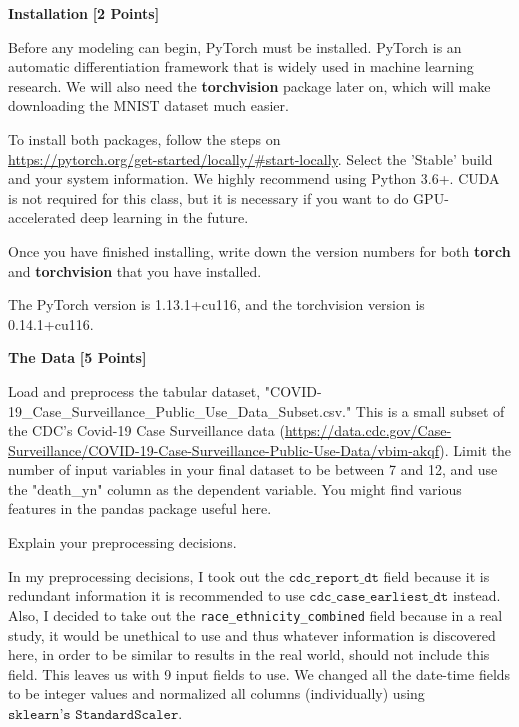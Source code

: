 \medskip

\problem \textbf{Installation} \textbf{[2 Points]}

Before any modeling can begin, PyTorch must be installed. PyTorch is an automatic differentiation framework that is widely used in machine learning research.  We will also need the \textbf{torchvision} package later on, which will make downloading the MNIST dataset much easier. 

To install both packages, follow the steps on \\
\url{https://pytorch.org/get-started/locally/#start-locally}. Select the 'Stable' build and your system information. We highly recommend using Python 3.6+. CUDA is not required for this class, but it is necessary if you want to do GPU-accelerated deep learning in the future.

Once you have finished installing, write down the version numbers for both \textbf{torch} and \textbf{torchvision} that you have installed.

\begin{solution}
  The PyTorch version is 1.13.1+cu116, and the torchvision version is 0.14.1+cu116.
\end{solution}

\problem \textbf{The Data} \textbf{[5 Points]}

Load and preprocess the tabular dataset, "COVID-19\_Case\_Surveillance\_Public\_Use\_Data\_Subset.csv." This is a small subset of the CDC's Covid-19 Case Surveillance data (\url{https://data.cdc.gov/Case-Surveillance/COVID-19-Case-Surveillance-Public-Use-Data/vbim-akqf}). Limit the number of input variables in your final dataset to be between 7 and 12, and use the "death\_yn" column as the dependent variable. You might find various features in the pandas package useful here.

Explain your preprocessing decisions.

\begin{solution}
  In my preprocessing decisions, I took out the $\texttt{cdc_report_dt}$ field because it is redundant information it is recommended to use $\texttt{cdc_case_earliest_dt}$ instead. Also, I decided to take out the \texttt{race_ethnicity_combined} field because in a real study, it would be unethical to use and thus whatever information is discovered here, in order to be similar to results in the real world, should not include this field. This leaves us with 9 input fields to use. We changed all the date-time fields to be integer values and normalized all columns (individually) using $\texttt{sklearn's StandardScaler}$.
\end{solution}


